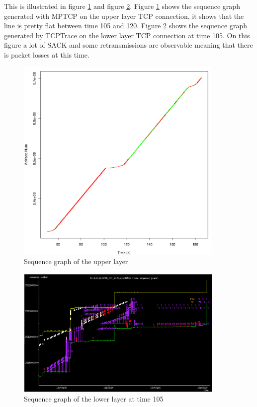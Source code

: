 This is illustrated in figure \ref{upper_seq} and figure \ref{lower_seq}.
Figure \ref{upper_seq} shows the sequence graph generated with MPTCP on the upper layer TCP connection, it shows that the line is pretty flat between time 105 and 120.
Figure \ref{lower_seq} shows the sequence graph generated by TCPTrace on the lower layer TCP connection at time 105. On this figure a lot of SACK and some retransmissions are observable meaning
that there is packet losses at this time.

\begin{figure}[h!]
  \centering
  \includegraphics[width=10cm]{../results/upper_layer_seq.pdf}
  \caption{Sequence graph of the upper layer}
  \label{upper_seq}
\end{figure}

\begin{figure}[h!]
  \centering
  \includegraphics[width=10cm]{../results/lower_layer_seq.pdf}
  \caption{Sequence graph of the lower layer at time 105}
  \label{lower_seq}
\end{figure}

